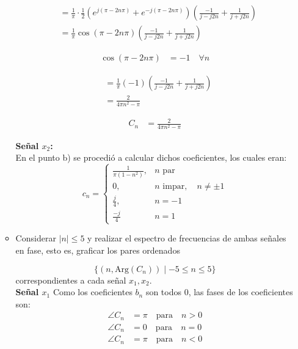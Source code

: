 \documentclass[12pt,a4paper]{report}
\begin{document}
\begin{enumerate}[label=\alph*),left=0pt]
\begin{itemize}[left=0pt]
      $$
      \begin{aligned}
      &= \frac{1}{\pi} \cdot \frac{1}{2} \left( e^{j(\pi - 2n\pi)} + e^{-j(\pi - 2n\pi)} \right) \left( \frac{-1}{j - j2n} + \frac{1}{j + j2n} \right) \\
      &= \frac{1}{\pi} \cos(\pi - 2n\pi) \left( \frac{-1}{j - j2n} + \frac{1}{j + j2n} \right)
      \end{aligned}
      $$
      
      $$
      \begin{aligned}
      \cos(\pi - 2n\pi) &= -1 \quad \forall n
      \end{aligned}
      $$
      
      $$
      \begin{aligned}
      &= \frac{1}{\pi} (-1) \left( \frac{-1}{j - j2n} + \frac{1}{j + j2n} \right) \\
      &= \frac{2}{4\pi n^{2} - \pi}
      \end{aligned}
      $$
      
      $$
      \begin{aligned}
      C_{n} &= \frac{2}{4\pi n^{2} - \pi}
      \end{aligned}
      $$
            

      \textbf{Señal $x_2$:}\\
      En el punto b) se procedió a calcular dichos coeficientes, los cuales eran:
      $$
      c_n = \begin{cases}
	      \frac{1}{\pi(1-n^2)}, & n \text{ par} \\[5pt]
	      0, & n \text{ impar}, \quad n \neq \pm 1 \\
	      \frac{j}{4}, & n=-1 \\
	      \frac{-j}{4} & n=1
      \end{cases}
      $$

    \item Considerar $|n| \leq 5$ y realizar el espectro de frecuencias de ambas señales en fase, esto es, graficar los 
      pares ordenados

      $$\{(n, \text{Arg}(C_n)) \mid -5 \leq n \leq 5\}$$
      correspondientes a cada señal $x_1, x_2$.\\

      \textbf{Señal $x_1$}
          Como los coeficientes \( b_{n} \) son todos 0, las fases de los coeficientes son:
  $$
    \begin{aligned}
      \angle C_{n} &= \pi \quad \text{para} \quad n > 0 \\
      \angle C_{n} &= 0 \quad \text{para} \quad n = 0 \\
      \angle C_{n} &= \pi \quad \text{para} \quad n < 0
    \end{aligned}
  $$


\end{itemize}
\end{enumerate}
\end{document}
